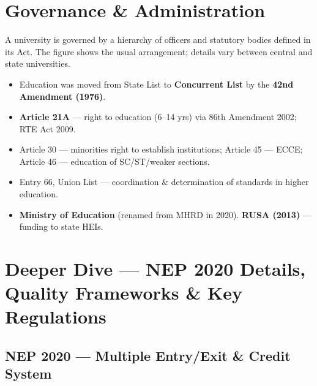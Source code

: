 \hypertarget{p1-10--8-governance--administration}{%
\section{Governance \& Administration}\label{p1-10--8-governance--administration}}

A university is governed by a hierarchy of officers and statutory bodies defined in its Act. The figure
shows the usual arrangement; details vary between central and state universities.



\begin{itemize}
\tightlist
\item
  Education was moved from State List to \textbf{Concurrent List} by the \textbf{42nd Amendment (1976)}.
\item
  \textbf{Article 21A} --- right to education (6--14 yrs) via 86th Amendment 2002; RTE Act 2009.
\item
  Article 30 --- minorities\textquotesingle{} right to establish institutions; Article 45 --- ECCE; Article 46 --- education of SC/ST/weaker sections.
\item
  Entry 66, Union List --- coordination \& determination of standards in higher education.
\item
  \textbf{Ministry of Education} (renamed from MHRD in 2020). \textbf{RUSA (2013)} --- funding to state HEIs.
\end{itemize}

\needspace{131pt}

\hypertarget{p1-10--9-deeper-dive--nep-2020-details-quality-frameworks--key-regulations}{%
\section{Deeper Dive --- NEP 2020 Details, Quality Frameworks \& Key Regulations}\label{p1-10--9-deeper-dive--nep-2020-details-quality-frameworks--key-regulations}}

\needspace{95pt}

\hypertarget{p1-10--91-nep-2020--multiple-entryexit--credit-system}{%
\subsection{NEP 2020 --- Multiple Entry/Exit \& Credit System}\label{p1-10--91-nep-2020--multiple-entryexit--credit-system}}



